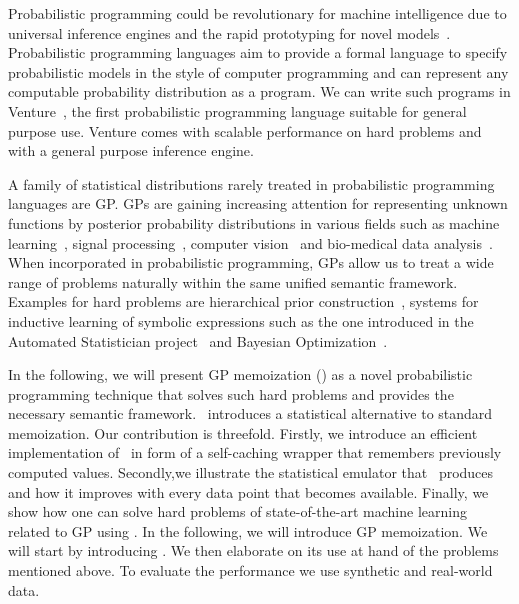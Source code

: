 Probabilistic programming could be revolutionary for machine intelligence due to universal inference engines and the rapid prototyping for novel models~\citep{ghahramani2015probabilistic}.
Probabilistic programming languages aim to provide a formal language to specify probabilistic models in the style of computer programming and can represent any computable probability distribution as a program.
We can write such programs in Venture~\citep{mansinghka2014venture}, the first probabilistic programming language suitable for general purpose use.
Venture comes with scalable performance on hard problems and with a general purpose inference engine.

A family of statistical distributions rarely treated in probabilistic programming languages are \ac{GP}. \ac{GP}s are gaining increasing attention for representing unknown functions by posterior probability distributions in various fields such as machine learning~\citep{rasmussen2006gaussian}, signal processing~\citep{clifton2013gaussian}, computer vision~\citep{kemmler2013one} and bio-medical data analysis~\citep{shepherd2012gaussian}.
When incorporated in probabilistic programming, \ac{GP}s allow us to treat a wide range of problems naturally within the same unified semantic framework.
Examples for hard problems are hierarchical prior construction~\citep{neal1997monte}, systems for inductive learning of symbolic expressions such as the one introduced in the Automated Statistician project~\citep{duvenaud2013structure,lloyd2014automatic} and Bayesian Optimization~\citep{snoek2012practical}.

In the following, we will present \ac{GP} memoization (\gpmem) as a novel probabilistic programming technique that solves such hard problems and provides the necessary semantic framework. \gpmem\ introduces a statistical alternative to standard memoization.  Our contribution is threefold. Firstly, we introduce an efficient implementation of \gpmem\ in form of a self-caching wrapper  that remembers previously computed values. Secondly,we illustrate the statistical emulator that \gpmem\ produces and how it improves with every data point that becomes available. Finally, we show how one can solve hard problems  of state-of-the-art machine learning related to \ac{GP}  using \gpmem.
In the following, we will introduce \ac{GP} memoization. We will start by introducing \gpmem. We then elaborate on its use at hand of the problems mentioned above. To evaluate the performance we use synthetic and real-world data.
